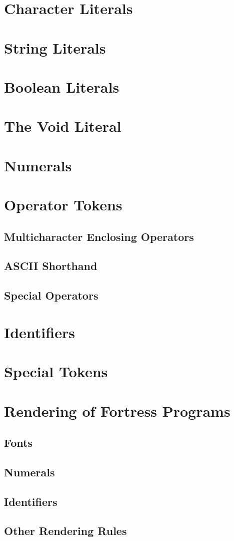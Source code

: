 \section{Character Literals}
\section{String Literals}
\section{Boolean Literals}
\section{The Void Literal}
\section{Numerals}
\section{Operator Tokens}
\subsection{Multicharacter Enclosing Operators}
\subsection{ASCII Shorthand}
\subsection{Special Operators}
\section{Identifiers}
\section{Special Tokens}
\section{Rendering of Fortress Programs}
\subsection{Fonts}
\subsection{Numerals}
\subsection{Identifiers}
\subsection{Other Rendering Rules}
\label{otherRendering}
